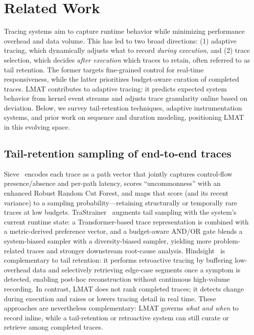 \documentclass[preprint,12pt]{elsarticle}
\begin{document}
\section{Related Work}\label{rwork}
Tracing systems aim to capture runtime behavior while minimizing performance overhead and data volume. This has led to two broad directions: (1) adaptive tracing, which dynamically adjusts what to record \emph{during execution}, and (2) trace selection, which decides \emph{after execution} which traces to retain, often referred to as tail retention. The former targets fine-grained control for real-time responsiveness, while the latter prioritizes budget-aware curation of completed traces. LMAT contributes to adaptive tracing: it predicts expected system behavior from kernel event streams and adjusts trace granularity online based on deviation. Below, we survey tail-retention techniques, adaptive instrumentation systems, and prior work on sequence and duration modeling, positioning LMAT in this evolving space.

\subsection{Tail-retention sampling of end-to-end traces}
Sieve~\cite{huang2021sieve} encodes each trace as a path vector that jointly captures control-flow presence/absence and per-path latency, scores “uncommonness” with an enhanced Robust Random Cut Forest, and maps that score (and its recent variance) to a sampling probability—retaining structurally or temporally rare traces at low budgets. TraStrainer~\cite{huang2024trastrainer} augments tail sampling with the system’s current runtime state: a Transformer-based trace representation is combined with a metric-derived preference vector, and a budget-aware AND/OR gate blends a system-biased sampler with a diversity-biased sampler, yielding more problem-related traces and stronger downstream root-cause analysis. Hindsight~\cite{zhang2023benefit} is complementary to tail retention: it performs retroactive tracing by buffering low-overhead data and selectively retrieving edge-case segments once a symptom is detected, enabling post-hoc reconstruction without continuous high-volume recording.
In contrast, LMAT does not rank completed traces; it detects change during execution and raises or lowers tracing detail in real time. These approaches are nevertheless complementary: LMAT governs \emph{what and when} to record inline, while a tail-retention or retroactive system can still curate or retrieve among completed traces.
\end{document}
